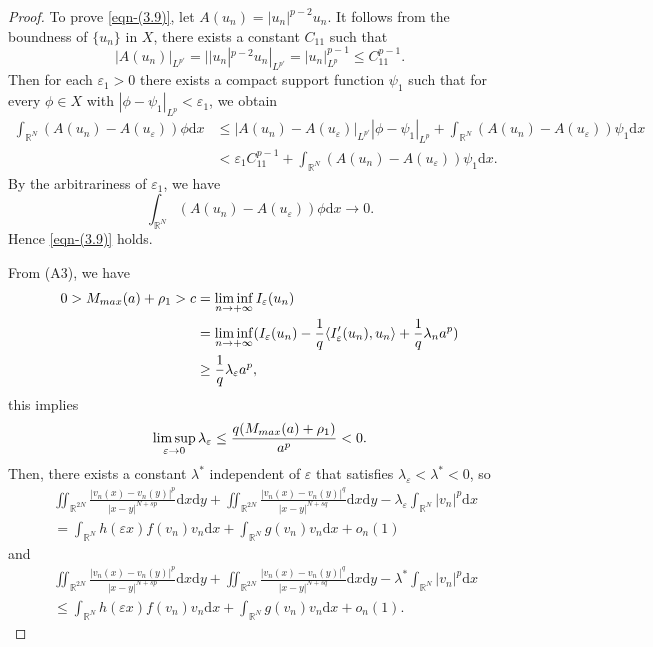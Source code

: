 \documentclass[10pt,a4paper]{amsart}
\numberwithin{equation}{section}
\begin{document}
\begin{proof}
To prove \eqref{eqn-(3.9)}, let $A(u_n)=|u_n|^{p-2}u_n$. It follows from the 
boundness of $\{u_n\}$ in $X$, there exists a constant $C_{11}$ such that
$$
|A(u_n)|_{L^{p'}}=||u_n|^{p-2}u_n|_{L^{p'}}=|u_n|_{L^p}^{p-1}\le C_{11}^{p-1}.
$$
Then for each $ \varepsilon_1>0$ there exists a compact support function $\psi_1$ 
such that for every $\phi\in X$ with $|\phi-\psi_1|_{L^p}<\varepsilon_1$,
we  obtain
\begin{align*}
\int_{\mathbb{R}^N}(A(u_n)-A(u_\varepsilon))\phi\mathrm{d}x
&\leq |A(u_n)-A(u_\varepsilon)|_{L^{p'}}|\phi-\psi_1|_{L^p}
 +\int_{\mathbb{R}^N}(A(u_n)-A(u_\varepsilon))\psi_1\mathrm{d}x\\
&<\varepsilon_1 C_{11}^{p-1}+\int_{\mathbb{R}^N}(A(u_n)-A(u_\varepsilon))
 \psi_1\mathrm{d}x.
\end{align*}
By the arbitrariness of $\varepsilon_1$, we have
$$
\int_{\mathbb{R}^N}(A(u_n)-A(u_\varepsilon))\phi\mathrm{d}x\to 0.
$$
Hence \eqref{eqn-(3.9)} holds.

From (A3), we have
\begin{align*}
0> M_{\rm max}(a) + \rho_1>c
&=\liminf_{n\to+\infty}I_\varepsilon(u_n)\\
&=\liminf_{n\to+\infty}(I_\varepsilon(u_n)
 -\frac{1}{q}\langle I_{\varepsilon}' (u_n),u_n\rangle+\frac{1}{q}\lambda_n a^{p})\\
&\ge\frac{1}{q}\lambda_\varepsilon a^{p},
\end{align*}
this implies
$$
\limsup_{\varepsilon\to0}\lambda_\varepsilon\le\frac{q(M_{\rm max}(a) 
+ \rho_1)}{a^{p}}<0.
$$
Then, there exists a constant $\lambda^{*}$ independent of $\varepsilon$
that satisfies $\lambda_\varepsilon<\lambda^{*}<0$, so
\begin{align*}
&\iint_{\mathbb{R}^{2N}}\frac{|v_n(x)-v_n(y)|^{p}}{|x-y|^{N+sp}}
 \mathrm{d}x\mathrm{d}y
 +\iint_{\mathbb{R}^{2N}}\frac{|v_n(x)-v_n(y)|^{q}}{|x-y|^{N+sq}}
 \mathrm{d}x\mathrm{d}y-\lambda_\varepsilon\int_{\mathbb{R}^N}| v_n|^{p}\mathrm{d}x\\
&=\int_{\mathbb{R}^N}h(\varepsilon x)f(v_n)v_n\mathrm{d}x
 +\int_{\mathbb{R}^N}g(v_n)v_n\mathrm{d}x+o_n(1)
\end{align*}
and
\begin{align*}
&\iint_{\mathbb{R}^{2N}}\frac{|v_n(x)-v_n(y)|^{p}}{|x-y|^{N+sp}}
 \mathrm{d}x\mathrm{d}y+\iint_{\mathbb{R}^{2N}}
 \frac{|v_n(x)-v_n(y)|^{q}}{|x-y|^{N+sq}}\mathrm{d}x\mathrm{d}y
 -\lambda^{*}\int_{\mathbb{R}^N}| v_n|^{p}\mathrm{d}x\\
&\le\int_{\mathbb{R}^N}h(\varepsilon x)f(v_n)v_n\mathrm{d}x
 +\int_{\mathbb{R}^N}g(v_n)v_n\mathrm{d}x+o_n(1).
\end{align*}


\end{proof}
\end{document}
